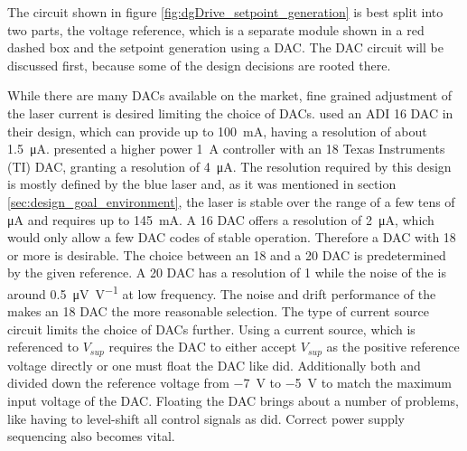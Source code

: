 The circuit shown in figure \ref{fig:dgDrive_setpoint_generation} is best split into two parts, the voltage reference, which is a separate module shown in a red dashed box and the setpoint generation using a DAC. The DAC circuit will be discussed first, because some of the design decisions are rooted there.

While there are many DACs available on the market, fine grained adjustment of the laser current is desired limiting the choice of DACs. \citeauthor{laser_driver_digital} \cite{laser_driver_digital} used an ADI  \qty{16}{\bit} DAC in their design, which can provide up to \qty{100}{\mA}, having a resolution of about \qty{1.5}{\uA}. \citeauthor{laser_driver_qcl_taubman_multiplexer} \cite{laser_driver_qcl_taubman_multiplexer} presented a higher power \qty{1}{\A} controller with an \qty{18}{\bit} Texas Instruments (TI)  DAC, granting a resolution of \qty{4}{\uA}. The resolution required by this design is mostly defined by the blue laser and, as it was mentioned in section \ref{sec:design_goal_environment}, the laser is stable over the range of a few tens of \unit{\uA} and requires up to \qty{145}{\mA}. A \qty{16}{\bit} DAC offers a resolution of \qty{2}{\uA}, which would only allow a few DAC codes of stable operation. Therefore a DAC with \qty{18}{\bit} or more is desirable. The choice between an \qty{18}{\bit} and a \qty{20}{\bit} DAC is predetermined by the given reference. A \qty{20}{\bit} DAC has a resolution of \qty{1}{\ppm} while the noise of the  is around \qty{0.5}{\uV \per \V} at low frequency. The noise and drift performance \cite{datasheet_LM399} of the  makes an \qty{18}{\bit} DAC the more reasonable selection. The type of current source circuit limits the choice of DACs further. Using a current source, which is referenced to $V_{sup}$ requires the DAC to either accept $V_{sup}$ as the positive reference voltage directly or one must float the DAC like \citeauthor{laser_driver_digital} \cite{laser_driver_digital} did. Additionally both \citeauthor{laser_driver_digital} \cite{laser_driver_digital} and \citeauthor{laser_driver_qcl_taubman_multiplexer} \cite{laser_driver_qcl_taubman_multiplexer} divided down the reference voltage from \qty{-7}{\V} to \qty{-5}{\V} to match the maximum input voltage of the DAC. Floating the DAC brings about a number of problems, like having to level-shift all control signals as \citeauthor{laser_driver_digital} \cite{laser_driver_digital} did. Correct power supply sequencing also becomes vital.

